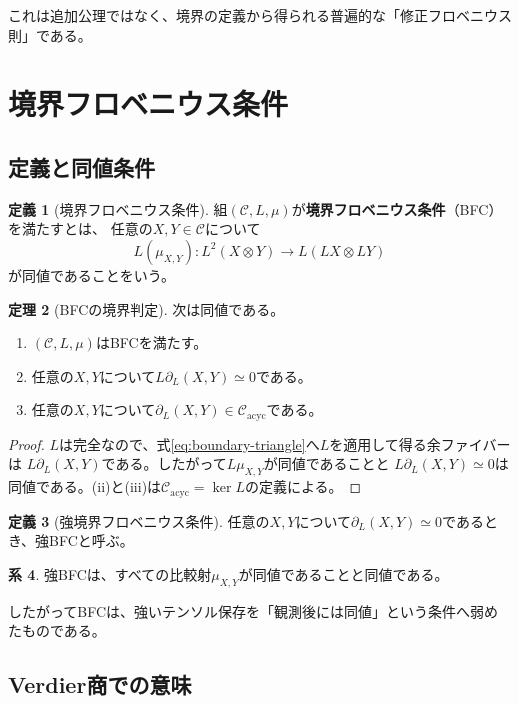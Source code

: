 \documentclass[11pt,a4paper]{ltjsarticle}
\theoremstyle{definition}
\newtheorem{definition}{定義}[section]
\newtheorem{theorem}[definition]{定理}
\newtheorem{corollary}[definition]{系}
\theoremstyle{remark}
\newcommand{\C}{\mathcal{C}}
\newcommand{\Cacyc}{\mathcal{C}_{\mathrm{acyc}}}
\newcommand{\Boundary}{\partial_L}
\begin{document}
これは追加公理ではなく、境界の定義から得られる普遍的な「修正フロベニウス則」である。

\section{境界フロベニウス条件}

\subsection{定義と同値条件}

\begin{definition}[境界フロベニウス条件]
組$(\C,L,\mu)$が\textbf{境界フロベニウス条件}（BFC）を満たすとは、
任意の$X,Y\in\C$について
\[
 L(\mu_{X,Y}):L^2(X\otimes Y)\longrightarrow L(LX\otimes LY)
\]
が同値であることをいう。
\end{definition}

\begin{theorem}[BFCの境界判定]
次は同値である。
\begin{enumerate}[label=(\roman*)]
 \item $(\C,L,\mu)$はBFCを満たす。
 \item 任意の$X,Y$について$L\Boundary(X,Y)\simeq0$である。
 \item 任意の$X,Y$について$\Boundary(X,Y)\in\Cacyc$である。
\end{enumerate}
\end{theorem}

\begin{proof}
$L$は完全なので、式\eqref{eq:boundary-triangle}へ$L$を適用して得る余ファイバーは
$L\Boundary(X,Y)$である。したがって$L\mu_{X,Y}$が同値であることと
$L\Boundary(X,Y)\simeq0$は同値である。(ii)と(iii)は$\Cacyc=\ker L$の定義による。
\end{proof}

\begin{definition}[強境界フロベニウス条件]
任意の$X,Y$について$\Boundary(X,Y)\simeq0$であるとき、強BFCと呼ぶ。
\end{definition}

\begin{corollary}
強BFCは、すべての比較射$\mu_{X,Y}$が同値であることと同値である。
\end{corollary}

したがってBFCは、強いテンソル保存を「観測後には同値」という条件へ弱めたものである。

\subsection{Verdier商での意味}
\end{document}
